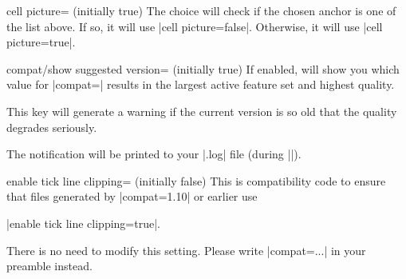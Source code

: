 {\begin{pgfplotskey}{cell picture= (initially true)}
    The choice  will check if the chosen anchor is
    one of the list above. If so, it will use |cell picture=false|. Otherwise,
    it will use |cell picture=true|.
\end{pgfplotskey}

\begin{pgfplotskey}{compat/show suggested version= (initially true)}
    If enabled, \PGFPlots{} will show you which value for
    |compat=| results in the largest active feature set and
    highest quality.

    This key will generate a warning if the current version is so old that the
    quality degrades seriously.

    The notification will be printed to your |.log| file (during
    ||).
\end{pgfplotskey}

\begin{pgfplotskey}{enable tick line clipping= (initially false)}
    This is compatibility code to ensure that files generated by |compat=1.10|
    or earlier use

    |enable tick line clipping=true|.

    There is no need to modify this setting. Please write |compat=...| in your
    preamble instead.
\end{pgfplotskey}
}
